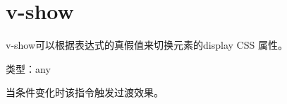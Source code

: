 \begin{lstlisting}[language=JavaScript]

\end{lstlisting}

\chapter{v-show}

v-show可以根据表达式的真假值来切换元素的display CSS 属性。

\begin{compactitem}
\item 类型：any
\end{compactitem}

当条件变化时该指令触发过渡效果。


\begin{lstlisting}[language=JavaScript]

\end{lstlisting}



\begin{lstlisting}[language=JavaScript]

\end{lstlisting}




\begin{lstlisting}[language=JavaScript]

\end{lstlisting}




\begin{lstlisting}[language=JavaScript]

\end{lstlisting}




\begin{lstlisting}[language=JavaScript]

\end{lstlisting}




\begin{lstlisting}[language=JavaScript]

\end{lstlisting}




\begin{lstlisting}[language=JavaScript]

\end{lstlisting}




